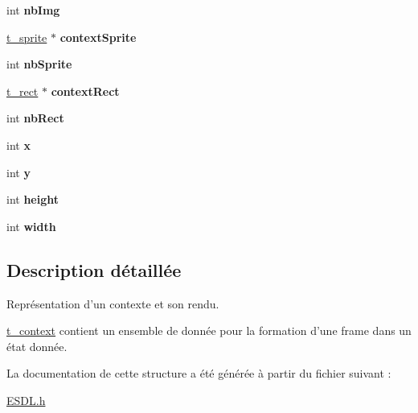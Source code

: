 \begin{DoxyCompactItemize}
\item 
\hypertarget{structt__context_ae47757016e9266e7df47b4d1319e1a4c}{int {\bfseries nb\+Img}}\label{structt__context_ae47757016e9266e7df47b4d1319e1a4c}

\item 
\hypertarget{structt__context_a949ecc795ffa0894bdd61002be377fe6}{\hyperlink{structt__sprite}{t\+\_\+sprite} $\ast$ {\bfseries context\+Sprite}}\label{structt__context_a949ecc795ffa0894bdd61002be377fe6}

\item 
\hypertarget{structt__context_a51e6c7c93aaf8410c47cb6db50ccbce0}{int {\bfseries nb\+Sprite}}\label{structt__context_a51e6c7c93aaf8410c47cb6db50ccbce0}

\item 
\hypertarget{structt__context_a5068352ab232e4068d6eb27736589da3}{\hyperlink{structt__rect}{t\+\_\+rect} $\ast$ {\bfseries context\+Rect}}\label{structt__context_a5068352ab232e4068d6eb27736589da3}

\item 
\hypertarget{structt__context_a1a5ca0e8502b8de81ee8efa706b5487e}{int {\bfseries nb\+Rect}}\label{structt__context_a1a5ca0e8502b8de81ee8efa706b5487e}

\item 
\hypertarget{structt__context_a1a0828803669253032ae6dd2dec3b79b}{int {\bfseries x}}\label{structt__context_a1a0828803669253032ae6dd2dec3b79b}

\item 
\hypertarget{structt__context_a6caa917ce075cd0c6c47902f81bbcdb8}{int {\bfseries y}}\label{structt__context_a6caa917ce075cd0c6c47902f81bbcdb8}

\item 
\hypertarget{structt__context_a7585c51afbdad4275ab21fa8c91e3018}{int {\bfseries height}}\label{structt__context_a7585c51afbdad4275ab21fa8c91e3018}

\item 
\hypertarget{structt__context_ae1483a2ec5583f21b774990ae286ae02}{int {\bfseries width}}\label{structt__context_ae1483a2ec5583f21b774990ae286ae02}

\end{DoxyCompactItemize}


\subsection{Description détaillée}
Représentation d'un contexte et son rendu. 

\hyperlink{structt__context}{t\+\_\+context} contient un ensemble de donnée pour la formation d'une frame dans un état donnée. 

La documentation de cette structure a été générée à partir du fichier suivant \+:\begin{DoxyCompactItemize}
\item 
\hyperlink{_e_s_d_l_8h}{E\+S\+D\+L.\+h}\end{DoxyCompactItemize}
